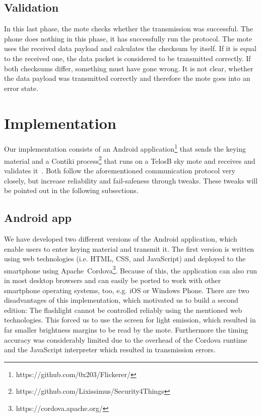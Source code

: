 \documentclass{sig-alternate} %
\begin{document}
\subsection{Validation}
\label{sub:validation}

In this last phase, the mote checks whether the transmission was successful.
The phone does nothing in this phase, it has successfully run the protocol.
The mote uses the received data payload and calculates the checksum by itself.
If it is equal to the received one, the data packet is considered to be transmitted correctly.
If both checksums differ, something must have gone wrong.
It is not clear, whether the data payload was transmitted correctly and therefore the mote goes into an error state.

\section{Implementation}
\label{sec:implementation}

Our implementation consists of an Android application\footnote{https://github.com/0x203/Flickerer/} that sends the keying material and a Contiki process\footnote{https://github.com/Lixissimus/Security4Things} that runs on a TelosB sky mote and receives and validates it~\cite{telosb}.
Both follow the aforementioned communication protocol very closely, but increase reliability and fail-safeness through tweaks. 
These tweaks will be pointed out in the following subsections.

\subsection{Android app}
\label{sub:android_app}

We have developed two different versions of the Android application, which enable users to enter keying material and transmit it.
The first version is written using web technologies (i.e. HTML, CSS, and JavaScript) and deployed to the smartphone using Apache~Cordova\footnote{https://cordova.apache.org/}.
Because of this, the application can also run in most desktop browsers and can easily be ported to work with other smartphone operating systems, too, e.g. iOS or Windows Phone.
There are two disadvantages of this implementation, which motivated us to build a second edition:
The flashlight cannot be controlled reliably using the mentioned web technologies.
This forced us to use the screen for light emission, which resulted in far smaller brightness margins to be read by the mote.
Furthermore the timing accuracy was considerably limited due to the overhead of the Cordova runtime and the JavaScript interpreter which resulted in transmission errors.
\end{document}
